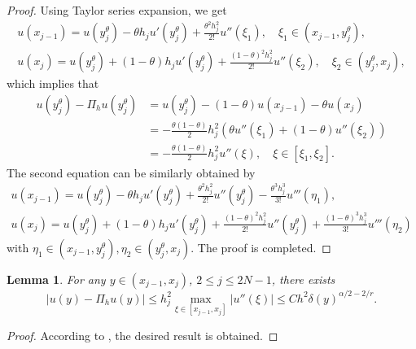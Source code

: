 \documentclass{amsart}
\newtheorem{lemma}[theorem]{Lemma}
\theoremstyle{definition}
\theoremstyle{remark}
\numberwithin{equation}{section}
\begin{document}
\begin{proof}
  Using Taylor series expansion, we get
  \begin{gather*}
    u(x_{j-1}) = u(y_j^\theta) - \theta h_{j} u'(y_j^\theta) + \frac{\theta^2 h_{j}^2}{2!} u''(\xi_1), \quad \xi_1 \in (x_{j-1}, y_j^\theta) ,\\
    u(x_{j}) = u(y_j^\theta) + (1-\theta) h_{j} u'(y_j^\theta) + \frac{(1-\theta)^2 h_{j}^2}{2!} u''(\xi_2) , \quad \xi_2 \in (y_j^\theta, x_j) ,
  \end{gather*}
  which implies that
  \begin{equation*}
    \begin{aligned}
      u(y_j^\theta) - \Pi_hu(y_j^\theta) 
      & = u(y_j^\theta) - (1-\theta) u(x_{j-1}) - \theta u(x_{j})      \\
      & = -\frac{\theta (1-\theta)}{2} h_j^2 ( \theta u''(\xi_1) + (1-\theta) u''(\xi_2) ) \\
      & = -\frac{\theta (1-\theta)}{2} h_j^2 u''(\xi), \quad \xi \in [\xi_1, \xi_2].
    \end{aligned}
  \end{equation*}
  The second equation can be similarly obtained by
  \begin{gather*}
    u(x_{j-1}) = u(y_j^\theta) - \theta h_{j} u'(y_j^\theta) + \frac{ \theta^2h_{j}^2}{2!} u''(y_j^\theta) - \frac{\theta^3 h_{j}^3}{3!} u'''(\eta_1) , \\
    u(x_{j}) = u(y_j^\theta) + (1-\theta) h_{j} u'(y_j^\theta) + \frac{(1-\theta)^2 h_{j}^2}{2!} u''(y_j^\theta) + \frac{(1-\theta)^3 h_{j}^3}{3!} u'''(\eta_2) 
  \end{gather*}
  with \(\eta_1 \in (x_{j-1}, y_j^\theta), \eta_2 \in (y_j^\theta, x_j)\).
  The proof is completed.
\end{proof}

\begin{lemma} \label{lmm:Dyjleh2ya/2m2/r}
  For any $y\in (x_{j-1}, x_{j})$, \(2\le j \le 2N-1\), there exists 
  \begin{equation*}
    |u(y)-\Pi_hu(y)| \le h_j^2 \max_{\xi\in [x_{j-1}, x_j]}|u''(\xi)| \le C h^2 \delta(y)^{\alpha/2-2/r}.
  \end{equation*}
\end{lemma}
\begin{proof}
  According to , the desired result is obtained.
\end{proof}
\end{document}

